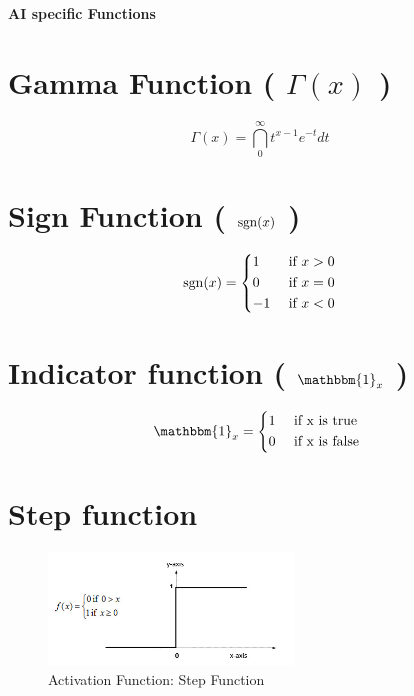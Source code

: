 \begingroup
\begin{center}
\fontsize{15}{15}\sffamily\selectfont
\textbf{AI specific Functions}
\end{center}
\endgroup

\section{Gamma Function ( $\Gamma(x)$ )}\label{Gamma Function}

\[
    \Gamma(x) = \dint_{0}^{\infty} t^{x-1} e^{-t} dt
\]


\section{Sign Function ( $\operatorname{sgn}(x)$ )}\label{Sign Function}
\[
    \operatorname{sgn}(x) = \begin{dcases}
         1 & \text{ if } x > 0 \\
         0 & \text{ if } x = 0 \\
         -1 & \text{ if } x < 0 
    \end{dcases}
\]

\section{Indicator function ( $\mathbbm{1}_x$ )}\label{Indicator function}

\[
    \mathbbm{1}_x = {\begin{dcases}
        1 & \text{ if x is true } \\
        0 & \text{ if x is false }
    \end{dcases}}
\]


\section{Step function \cite{wiki-Artificial_neuron}}\label{Step function}

\begin{figure}[H]
    \centering
    \includegraphics[height=3cm]{Pictures/activation-fns/step-function.jpg}
    \caption{Activation Function: Step Function}
\end{figure}

